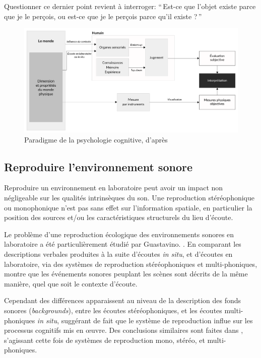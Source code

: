 Questionner ce dernier point revient à interroger: ``\,Est-ce que l'objet existe parce que je le perçois, ou est-ce que je le perçois parce qu'il existe ?\,''

\begin{figure}[t]
        \myfloatalign
        \includegraphics[width=\linewidth]{gfx/ch_3/paradigmepsychoco}
        \caption[Paradigme de la psychologie cognitive]{Paradigme de la psychologie cognitive, d'après \citep{maffiolo_caracterisation_1999}}\label{fig:paradigmePsychoCo}
\end{figure}

\subsection{Reproduire l'environnement sonore}
\label{sec:ch3_soundReproduction}

Reproduire un environnement en laboratoire peut avoir un impact non négligeable sur les qualités intrinsèques du son. Une reproduction stéréophonique ou monophonique n'est pas sans effet sur l'information spatiale, en particulier la position des sources et/ou les caractéristiques structurels du lieu d'écoute.

Le problème d'une reproduction écologique des environnements sonores en laboratoire a été particulièrement étudié par Guastavino. \citep{guastavino2003approche,guastavino2004perceptual,guastavino2005ecological}. En comparant les descriptions verbales produites à la suite d'écoutes \emph{in situ}, et d'écoutes en laboratoire, via des systèmes de reproduction stéréophoniques et multi-phoniques, \citep{guastavino2005ecological} montre que les événements sonores peuplant les scènes sont décrits de la même manière, quel que soit le contexte d'écoute.

Cependant des différences apparaissent au niveau de la description des fonds sonores (\emph{backgrounds}), entre les écoutes stéréophoniques, et les écoutes multi-phoniques \emph{in situ}, suggérant de fait que le système de reproduction influe sur les processus cognitifs mis en œuvre. Des conclusions similaires sont faites dans \citep{guastavino2004perceptual}, s'agissant cette fois de systèmes de reproduction mono, stéréo, et multi-phoniques. 

